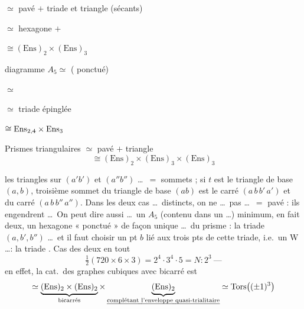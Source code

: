 \documentclass[11pt,a4paper]{article}
\begin{document}
$\simeq$ pavé $+$ triade et triangle (sécants)

\struck{\ill{}} $\simeq$ hexagone $+$  

$\cong (\mathrm{Ens})_2 \times (\mathrm{Ens})_3$

diagramme $A_5 \simeq$ (  ponctué)

$\simeq$ \struck{\ill{}} 

$\simeq$ triade épinglée

$\cong \mathrm{Ens}_{2,\text{\struck{4}}} \times \mathrm{Ens}_3$

Prismes triangulaires \struck{\ill{}} $\simeq$ pavé $+$ triangle
\[
\cong (\mathrm{Ens})_2 \times (\mathrm{Ens})_3 \times (\mathrm{Ens})_3
\]


les triangles sur $(a'b')$ et $(a''b'')$ \ldots\ $=$ sommets ; si $t$ est le  triangle de base $(a,b)$,  troisième sommet  du triangle de base $(ab)$ est le carré $(a\,b\,b'\,a')$ et du carré $(a\,b\,b''\,a'')$. Dans les deux cas \ldots\ distincts, on ne \ldots\ pas \ldots\ $=$ pavé : ils engendrent \ldots\ On peut dire aussi \ldots\ un $A_5$ (contenu dans un \ldots) minimum, en fait deux, un hexagone « ponctué » de façon unique \ldots\ du prisme : la triade $(a, b', b'')$ \ldots\ et il faut choisir un pt $b$ lié aux trois pts de cette triade, i.e.\ un W \ldots : la triade . Cas des deux en tout
\[
\tfrac12(720 \times 6 \times 3) = 2^4 \cdot 3^4 \cdot 5 = N : 2^3 \ \text{---}
\]
en effet, la cat.\ des \struck{\ill{}} graphes cubiques avec bicarré est
\[
\simeq \underbrace{(\mathrm{Ens})_2 \times (\mathrm{Ens})_2}_{\text{bicarrés}} \times \underbrace{(\mathrm{Ens})_2}_{\text{\uncertain{complétant l'enveloppe quasi-trialitaire}}} \simeq \mathrm{Tors}\bigl((\pm1)^3\bigr)
\]
\end{document}
